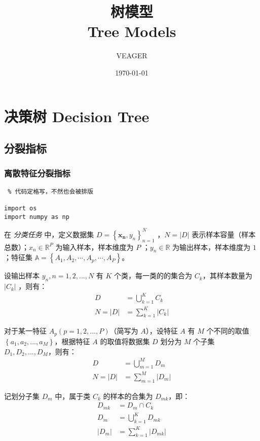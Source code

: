 \documentclass{ctexart}
\title{树模型 \\ Tree Models}
\author{VEAGER}
\date{\today}
\numberwithin{equation}{section}
\begin{document}
	
\maketitle

\newpage

\section{决策树 Decision Tree}

\subsection{分裂指标}

\subsubsection{离散特征分裂指标}

\begin{lstlisting} % 代码定格写，不然也会被排版
	
import os
import numpy as np
\end{lstlisting}

在 \emph{分类任务} 中，定义数据集 $D = \left\{ \boldsymbol{x_n}, y_n \right\} ^{N}_{n=1}  $ ，$ N = \left| D \right|$ 表示样本容量（样本总数）；$x_n \in \mathbb{R}^P $ 为输入样本，样本维度为 $P$ ；$y_n \in \mathbb{R} $ 为输出样本，样本维度为 $1$ ；特征集 $\mathbb{A} = \left\{ A_1, A_2, \cdots, A_p, \cdots, A_P \right\}$。

设输出样本 $y_n,n=1,2,...,N$ 有 $K$ 个类，每一类的的集合为 $ C_k $，其样本数量为 $ \left| C_k \right|$ ，则有：
\begin{align}
	D &= \bigcup^{K}_{k=1} C_k \\
	N = \left| D \right| &= \sum^{K}_{k=1} \left| C_k \right|
\end{align}

对于某一特征 $A_p ( p=1,2,...,P)$（简写为 $A$），设特征 $A$ 有 $M$ 个不同的取值 $\left\{ a_1,a_2,...,a_M \right\}$，根据特征 $A$ 的取值将数据集 $D$ 划分为 $M$ 个子集 $D_1,D_2,...,D_M$，则有：
\begin{align}
	D &= \bigcup^{M}_{m=1} D_m \\
	N = \left| D \right| &= \sum^{M}_{m=1} \left| D_m \right|
\end{align}

记划分子集 $D_m$ 中，属于类 $C_k$ 的样本的合集为 $D_{mk}$，即：
\begin{align}
	D_{mk} &= D_m \cap C_k \\
	D_m  &= \bigcup^{K}_{k=1} D_{mk} \\
	\left| D_m \right| &= \sum^{K}_{k=1}  \left| D_{mk} \right|
\end{align}
\end{document}
